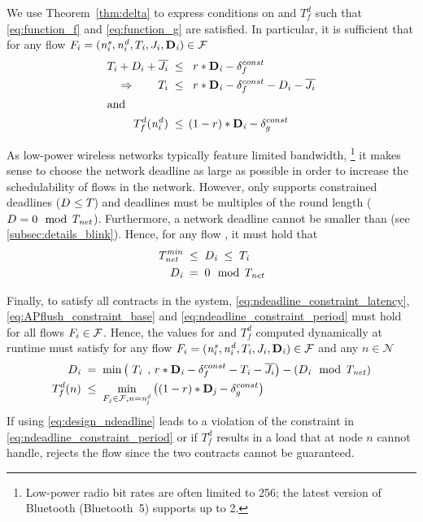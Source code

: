 We use Theorem~\ref{thm:delta} to express conditions on \ndeadlinei and $T_f^d$ such that \eqref{eq:function_f} and \eqref{eq:function_g} are satisfied.
In particular, it is sufficient that for any flow $F_{i} = (\mathit{n^s_{i}},\mathit{n^d_{i}},T_{\mathit{i}},J_{i},\mathbf{D}_{\mathit{i}}) \in \mathcal{F}$
\begin{align}
\nonumber
 T_i + D_i + \overline{J_{i}} \;
	& \leq  \;\; r * \mathbf{D}_{\mathit{i}} - \delta_f^{const} \\
\label{eq:ndeadline_constraint_latency}
\Rightarrow \qquad T_i \;
	& \leq  \;\; r * \mathbf{D}_{\mathit{i}} - \delta_f^{const} - D_i - \overline{J_{i}} \\
\intertext{and}
\label{eq:APflush_constraint_base}
T_f^d(\mathit{n^d_{i}}) \;
	& \leq \, (1-r)*\mathbf{D}_{\mathit{i}} -  \delta_g^{const}
\end{align}

As low-power wireless networks typically feature limited bandwidth,%
\footnote{Low-power radio bit rates are often limited to 256\kbps; the latest version of Bluetooth (Bluetooth~5) supports up to 2\Mbps.}
%
it makes sense to choose the network deadline \ndeadlinei as large as possible in order to increase the schedulability of flows in the network.
However, \blink only supports constrained deadlines ($D_{\mathit{}} \leq T_{\mathit{}}$) and deadlines must be multiples of the round length ($D_{\mathit{}} = 0 \mod {\mathit{T_{net}}} $).
Furthermore, a network deadline cannot be smaller than \rperiodmin (see \cref{subsec:details_blink}).
%
Hence, for any flow \flowi, it must hold that
\begin{align}
  \label{eq:ndeadline_constraint_period}
  \mathit{T_{net}^{min}} \; &\leq \; D_{\mathit{i}} \; \leq \; T_{\mathit{i}} \\
  D_{\mathit{i}} \; &= \; 0 \mod {\mathit{T_{net}}}
\end{align}

Finally, to satisfy all contracts in the system, \eqref{eq:ndeadline_constraint_latency}, \eqref{eq:APflush_constraint_base} and \eqref{eq:ndeadline_constraint_period} must hold for all flows $F_{i} \in \mathcal{F}$.
Hence, the values for \ndeadlinei and $T_f^d$ computed dynamically at runtime must satisfy for any flow $F_{i} = (\mathit{n^s_{i}},\mathit{n^d_{i}},T_{\mathit{i}},J_{i},\mathbf{D}_{\mathit{i}}) \in \mathcal{F}$ and any $n \in \mathcal{N}$
\begin{align}
\label{eq:design_ndeadline}
D_{\mathit{i}} \;
	& = \; \min \left(\; T_{\mathit{i}} \;\, , \,  r*\mathbf{D}_{\mathit{i}} - \delta_f^{const} - T_{\mathit{i}} - \overline{J_{i}} \right) - (D_{\mathit{i}} \mod {\mathit{T_{net}}}) \\
\label{eq:design_delay_destination}
T_f^d(n) \;
	& \leq \; \min_{F_j\in \mathcal{F}, n = \mathit{n^d_{j}}}
	\left( (1-r)*\mathbf{D}_{\mathit{j}} - \delta_g^{const} \right)
\end{align}
If using \eqref{eq:design_ndeadline} leads to a violation of the constraint in \eqref{eq:ndeadline_constraint_period} or if $T_f^d$ results in a load that \ap at node $n$ cannot handle, \DRP rejects the flow since the two contracts cannot be guaranteed.


